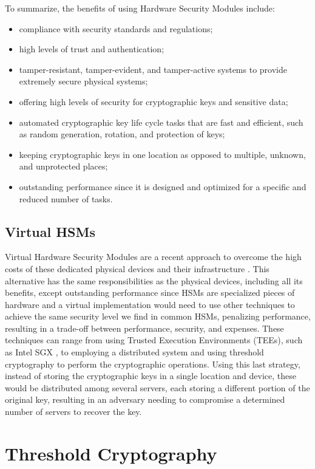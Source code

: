 To summarize, the benefits of using Hardware Security Modules include:
\begin{itemize}
    \item compliance with security standards and regulations;
    \item high levels of trust and authentication;
    \item tamper-resistant, tamper-evident, and tamper-active systems to provide extremely secure physical systems;
    \item offering high levels of security for cryptographic keys and sensitive data;
    \item automated cryptographic key life cycle tasks that are fast and efficient, such as random generation, rotation, and protection of keys;
    \item keeping cryptographic keys in one location as opposed to multiple, unknown, and unprotected places;
    \item outstanding performance since it is designed and optimized for a specific and reduced number of tasks. 
\end{itemize}

\subsection{Virtual HSMs} \label{subsec:virtual-hsms}
Virtual Hardware Security Modules are a recent approach to overcome the high costs of these dedicated physical devices and their infrastructure \cite{hsmeconomics}. This alternative has the same responsibilities as the physical devices, including all its benefits, except outstanding performance since HSMs are specialized pieces of hardware and a virtual implementation would need to use other techniques to achieve the same security level we find in common HSMs, penalizing performance, resulting in a trade-off between performance, security, and expenses. These techniques can range from using Trusted Execution Environments (TEEs), such as Intel SGX \cite{intelsgx}, to employing a distributed system and using threshold cryptography to perform the cryptographic operations. Using this last strategy, instead of storing the cryptographic keys in a single location and device, these would be distributed among several servers, each storing a different portion of the original key, resulting in an adversary needing to compromise a determined number of servers to recover the key.


\section{Threshold Cryptography} \label{sec:threshold-cryptography}

